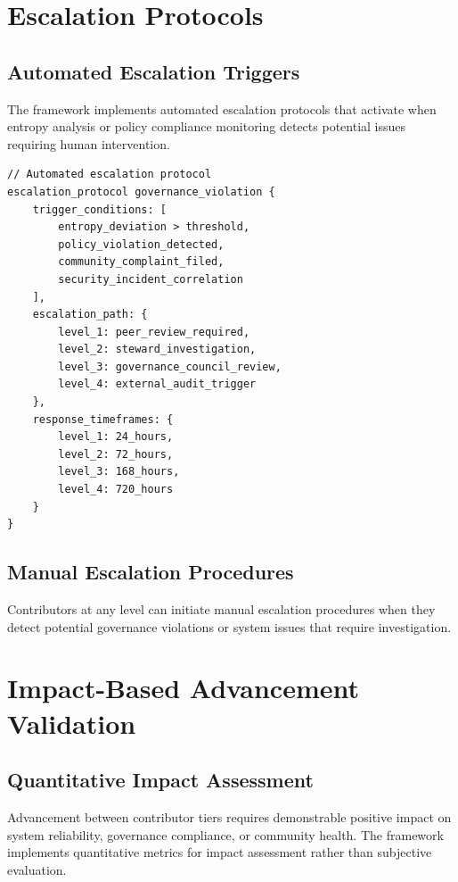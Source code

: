 \section{Escalation Protocols}

\subsection{Automated Escalation Triggers}

The framework implements automated escalation protocols that activate when entropy analysis or policy compliance monitoring detects potential issues requiring human intervention.

\begin{lstlisting}[style=riftlang, language=rift]
// Automated escalation protocol
escalation_protocol governance_violation {
    trigger_conditions: [
        entropy_deviation > threshold,
        policy_violation_detected,
        community_complaint_filed,
        security_incident_correlation
    ],
    escalation_path: {
        level_1: peer_review_required,
        level_2: steward_investigation,
        level_3: governance_council_review,
        level_4: external_audit_trigger
    },
    response_timeframes: {
        level_1: 24_hours,
        level_2: 72_hours,
        level_3: 168_hours,
        level_4: 720_hours
    }
}
\end{lstlisting}

\subsection{Manual Escalation Procedures}

Contributors at any level can initiate manual escalation procedures when they detect potential governance violations or system issues that require investigation.

\section{Impact-Based Advancement Validation}

\subsection{Quantitative Impact Assessment}

Advancement between contributor tiers requires demonstrable positive impact on system reliability, governance compliance, or community health. The framework implements quantitative metrics for impact assessment rather than subjective evaluation.


